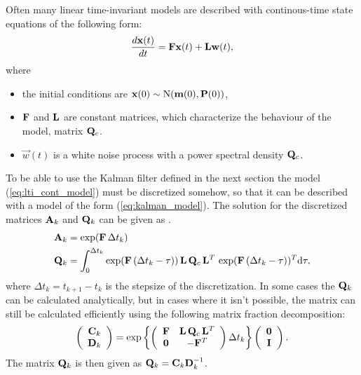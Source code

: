 Often many linear time-invariant models are described with
continous-time state equations of the following form:
%
\begin{equation}
%
\frac{d \vec{x}(t)}{d t} = \mat{F} \vec{x}(t) + \mat{L} \vec{w}(t),
%
\label{eq:lti_cont_model}
%
\end{equation}
%
where
%
\begin{itemize}
%
\item the initial conditions are $\mathbf{x}(0) \sim
\operatorname{N}(\mathbf{m}(0),\mathbf{P}(0))$,
%
\item $\mathbf{F}$ and $\mathbf{L}$ are constant matrices, which
characterize the behaviour of the model,
matrix $\mathbf{Q}_c$.
\item $\vec{w}(t)$ is a white noise process with a power spectral
density $\mathbf{Q}_c$.
%
\end{itemize}

To be able to use the Kalman filter defined in the next section the
model (\ref{eq:lti_cont_model}) must be discretized somehow, so that
it can be described with a model of the form
(\ref{eq:kalman_model}). The solution for the discretized matrices
$\mathbf{A}_k$ and $\mathbf{Q}_k$ can be given as \citep[see, e.g.,][]{Sarkka:2006b,
Bar-Shalom+Li+Kirubarajan:2001}.
%
\begin{align} \mathbf{A}_k &= \exp(\mathbf{F} \, \Delta t_k)
\label{eq:ode_ak} \\ \mathbf{Q}_k &= \int_{0}^{\Delta t_k} \exp( \mathbf{F}
\, (\Delta t_k - \tau)) \, \mathbf{L} \, \mathbf{Q}_c \, \mathbf{L}^T \, \exp(
\mathbf{F} \, (\Delta t_k - \tau))^T \mathrm{d} \tau,
\label{eq:ode_qk}
\end{align}
%
where $\Delta t_k = t_{k+1} - t_k$ is the stepsize of the
discretization. In some cases the $\mathbf{Q}_k$ can be calculated
analytically, but in cases where it isn't possible, the matrix can
still be calculated efficiently using the following matrix fraction
decomposition:
%
%
  \begin{equation} \left( \begin{array}{c} \mathbf{C}_k \\ \mathbf{D}_k
  \end{array} \right) = \exp \left\{ \left( \begin{array}{cc} \mathbf{F}
& \mathbf{L} \, \mathbf{Q}_c \, \mathbf{L}^T \\ \mathbf{0} & -\mathbf{F}^T
  \end{array} \right) \Delta t_k \right\} \left( \begin{array}{c}
\mathbf{0} \\ \mathbf{I}
  \end{array} \right).
  \label{eq:noisy_ltisolution_cov1}
  \end{equation}
The matrix $\mathbf{Q}_k$ is then given as $\mathbf{Q}_k = \mathbf{C}_k
\mathbf{D}_k^{-1}$.

